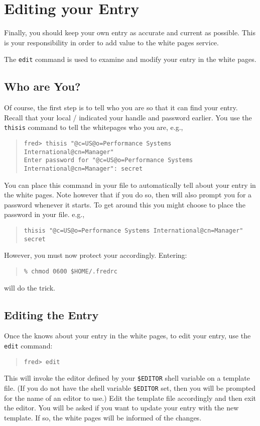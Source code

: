 \section	{Editing your Entry}
Finally,
you should keep your own entry as accurate and current as possible.
This is your responsibility in order to add value to the white pages service.
	
The \verb"edit" command is used to examine and modify your entry in the white
pages.

\subsection	{Who are You?}
Of course,
the first step is to tell  who you are so that it can find your
entry.
Recall that your local \camayoc/ indicated your handle and password earlier.
You use the \verb"thisis" command to tell the whitepages who you are,
e.g.,
\begin{quote}\tiny\begin{verbatim}
fred> thisis "@c=US@o=Performance Systems International@cn=Manager"
Enter password for "@c=US@o=Performance Systems International@cn=Manager": secret
\end{verbatim}\end{quote}
You can place this command in your  file to automatically tell
 about your entry in the white pages.
Note however that if you do so,
then  will also prompt you for a password whenever it starts.
To get around this you might choose to place the password in your
 file.
e.g.,
\begin{quote}\small\begin{verbatim}
thisis "@c=US@o=Performance Systems International@cn=Manager" secret
\end{verbatim}\end{quote}
However,
you must now protect your  accordingly.
Entering:
\begin{quote}\small\begin{verbatim}
% chmod 0600 $HOME/.fredrc
\end{verbatim}\end{quote}
will do the trick.

\subsection	{Editing the Entry}
Once the  knows about your entry in the white pages,
to edit your entry, use the \verb"edit" command:
\begin{quote}\small\begin{verbatim}
fred> edit
\end{verbatim}\end{quote}
This will invoke the editor defined by your \verb"$EDITOR" shell variable on a
template file.
(If you do not have the shell variable \verb"$EDITOR" set,
then you will be prompted for the name of an editor to use.)
Edit the template file accordingly and then exit the editor.
You will be asked if you want to update your entry with the new template.
If so,
the white pages will be informed of the changes.


